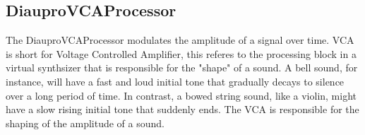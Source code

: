 \subsection{DiauproVCAProcessor}

The DiauproVCAProcessor modulates the amplitude of a signal over time. VCA is short for Voltage Controlled Amplifier, this referes to the processing block in a virtual synthsizer that is responsible for the "shape" of a sound. A bell sound, for instance, will have a fast and loud initial tone that gradually decays to silence over a long period of time. In contrast, a bowed string sound, like a violin, might have a slow rising initial tone that suddenly ends. The VCA is responsible for the shaping of the amplitude of a sound.

